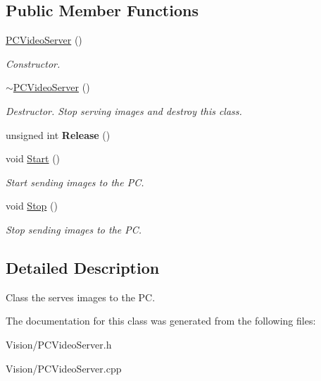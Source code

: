 \subsection*{Public Member Functions}
\begin{DoxyCompactItemize}
\item 
\hypertarget{classPCVideoServer_a6dc5b2af2f216d3478e6500dae62fe24}{
\hyperlink{classPCVideoServer_a6dc5b2af2f216d3478e6500dae62fe24}{PCVideoServer} ()}
\label{classPCVideoServer_a6dc5b2af2f216d3478e6500dae62fe24}

\begin{DoxyCompactList}\small\item\em Constructor. \end{DoxyCompactList}\item 
\hypertarget{classPCVideoServer_a1b4559d8497eb287237bcf935392eb3a}{
\hyperlink{classPCVideoServer_a1b4559d8497eb287237bcf935392eb3a}{$\sim$PCVideoServer} ()}
\label{classPCVideoServer_a1b4559d8497eb287237bcf935392eb3a}

\begin{DoxyCompactList}\small\item\em Destructor. Stop serving images and destroy this class. \end{DoxyCompactList}\item 
\hypertarget{classPCVideoServer_a91dc65b59304775937010038913f4993}{
unsigned int {\bfseries Release} ()}
\label{classPCVideoServer_a91dc65b59304775937010038913f4993}

\item 
\hypertarget{classPCVideoServer_a144c5b3cf67fdc9b5f7984fc46c691d3}{
void \hyperlink{classPCVideoServer_a144c5b3cf67fdc9b5f7984fc46c691d3}{Start} ()}
\label{classPCVideoServer_a144c5b3cf67fdc9b5f7984fc46c691d3}

\begin{DoxyCompactList}\small\item\em Start sending images to the PC. \end{DoxyCompactList}\item 
\hypertarget{classPCVideoServer_ac8bea302c03c79d35b4fab54fb6b1bce}{
void \hyperlink{classPCVideoServer_ac8bea302c03c79d35b4fab54fb6b1bce}{Stop} ()}
\label{classPCVideoServer_ac8bea302c03c79d35b4fab54fb6b1bce}

\begin{DoxyCompactList}\small\item\em Stop sending images to the PC. \end{DoxyCompactList}\end{DoxyCompactItemize}


\subsection{Detailed Description}
Class the serves images to the PC. 

The documentation for this class was generated from the following files:\begin{DoxyCompactItemize}
\item 
Vision/PCVideoServer.h\item 
Vision/PCVideoServer.cpp\end{DoxyCompactItemize}
